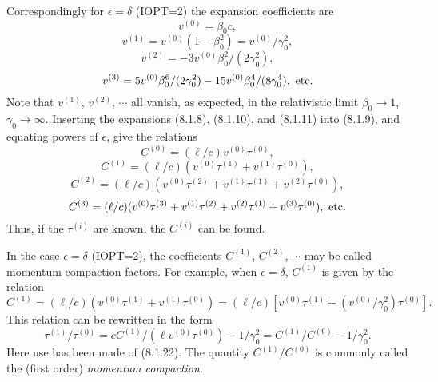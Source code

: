 Correspondingly for $\epsilon = \delta$ (IOPT=2) the expansion coefficients are
\begin{equation}
v^{(0)} = \beta_0c,
\end{equation}
\begin{equation}
v^{(1)} = v^{(0)} (1 - \beta_0^2) = v^{(0)}/\gamma^2_0,
\end{equation}
\begin{equation}
v^{(2)} = -3v^{(0)} \beta^2_0/(2\gamma^2_0),
\end{equation}
\begin{equation}
v^{(3)} = 5v^{(0)} \beta^6_0/(2\gamma^2_0) - 15v^{(0)}
\beta^4_0/(8\gamma^4_0), \ {\rm etc.}
\end{equation}
Note that $v^{(1)}$, $v^{(2)}$, $\cdots$ all vanish, as expected, in the
relativistic limit $\beta_0 \rightarrow 1$, $\gamma_0 \rightarrow
\infty$.  Inserting the expansions (8.1.8), (8.1.10), and (8.1.11) into (8.1.9),
and equating powers of $\epsilon$, give the relations
\begin{equation}
C^{(0)} = (\ell /c) v^{(0)} \tau^{(0)},
\end{equation}
\begin{equation}
C^{(1)} = (\ell /c) (v^{(0)} \tau^{(1)} + v^{(1)} \tau^{(0)}),
\end{equation}
\begin{equation}
C^{(2)} = (\ell /c)(v^{(0)} \tau^{(2)} + v^{(1)} \tau^{(1)} + v^{(2)}
\tau^{(0)}),
\end{equation}
\begin{equation}
C^{(3)} = (\ell /c)(v^{(0)} \tau^{(3)} + v^{(1)} \tau^{(2)} + v^{(2)}
\tau^{(1)} + v^{(3)} \tau^{(0)}), \ {\rm etc.}
\end{equation}
Thus, if the $\tau^{(i)}$ are known, the $C^{(i)}$ can be found.

In the case $\epsilon = \delta$ (IOPT=2), the coefficients $C^{(1)}$,
$C^{(2)}$, $\cdots$ may be called momentum compaction factors.  For
example, when $\epsilon = \delta$, $C^{(1)}$ is given by the relation
\begin{equation}
C^{(1)} = (\ell /c) (v^{(0)} \tau^{(1)} + v^{(1)} \tau^{(0)}) = (\ell /c) [v^{(0)} \tau^{(1)} +
(v^{(0)}/\gamma_0^2) \tau^{(0)}].
\end{equation}
This relation can be rewritten in the form
\begin{equation}
\tau^{(1)}/\tau^{(0)} = cC^{(1)}/(\ell v^{(0)} \tau^{(0)}) - 1/\gamma_0^2 =
C^{(1)}/C^{(0)} - 1/\gamma^2_0.
\end{equation}
Here use has been made of (8.1.22).  The quantity $C^{(1)}/C^{(0)}$ is
commonly called the (first order) {\em momentum compaction}.


